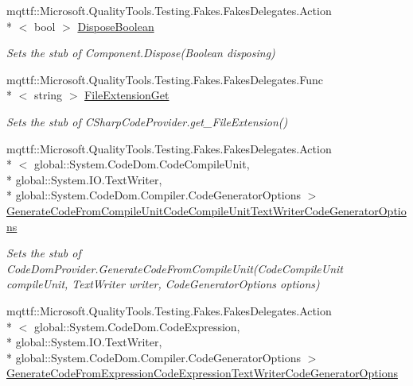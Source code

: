 \begin{DoxyCompactItemize}
mqttf\-::\-Microsoft.\-Quality\-Tools.\-Testing.\-Fakes.\-Fakes\-Delegates.\-Action\\*
$<$ bool $>$ \hyperlink{class_microsoft_1_1_c_sharp_1_1_fakes_1_1_stub_c_sharp_code_provider_a83dafacd3e80b9584e294dcb93acac7a}{Dispose\-Boolean}
\begin{DoxyCompactList}\small\item\em Sets the stub of Component.\-Dispose(\-Boolean disposing)\end{DoxyCompactList}\item 
mqttf\-::\-Microsoft.\-Quality\-Tools.\-Testing.\-Fakes.\-Fakes\-Delegates.\-Func\\*
$<$ string $>$ \hyperlink{class_microsoft_1_1_c_sharp_1_1_fakes_1_1_stub_c_sharp_code_provider_a4e4f3d83ddcbf64a32eac74f476e1b33}{File\-Extension\-Get}
\begin{DoxyCompactList}\small\item\em Sets the stub of C\-Sharp\-Code\-Provider.\-get\-\_\-\-File\-Extension()\end{DoxyCompactList}\item 
mqttf\-::\-Microsoft.\-Quality\-Tools.\-Testing.\-Fakes.\-Fakes\-Delegates.\-Action\\*
$<$ global\-::\-System.\-Code\-Dom.\-Code\-Compile\-Unit, \\*
global\-::\-System.\-I\-O.\-Text\-Writer, \\*
global\-::\-System.\-Code\-Dom.\-Compiler.\-Code\-Generator\-Options $>$ \hyperlink{class_microsoft_1_1_c_sharp_1_1_fakes_1_1_stub_c_sharp_code_provider_aca9668f5733629745589a8e850d9cd43}{Generate\-Code\-From\-Compile\-Unit\-Code\-Compile\-Unit\-Text\-Writer\-Code\-Generator\-Options}
\begin{DoxyCompactList}\small\item\em Sets the stub of Code\-Dom\-Provider.\-Generate\-Code\-From\-Compile\-Unit(\-Code\-Compile\-Unit compile\-Unit, Text\-Writer writer, Code\-Generator\-Options options)\end{DoxyCompactList}\item 
mqttf\-::\-Microsoft.\-Quality\-Tools.\-Testing.\-Fakes.\-Fakes\-Delegates.\-Action\\*
$<$ global\-::\-System.\-Code\-Dom.\-Code\-Expression, \\*
global\-::\-System.\-I\-O.\-Text\-Writer, \\*
global\-::\-System.\-Code\-Dom.\-Compiler.\-Code\-Generator\-Options $>$ \hyperlink{class_microsoft_1_1_c_sharp_1_1_fakes_1_1_stub_c_sharp_code_provider_aebc35ab5293803fceac07050abee2ac4}{Generate\-Code\-From\-Expression\-Code\-Expression\-Text\-Writer\-Code\-Generator\-Options}

\end{DoxyCompactItemize}
